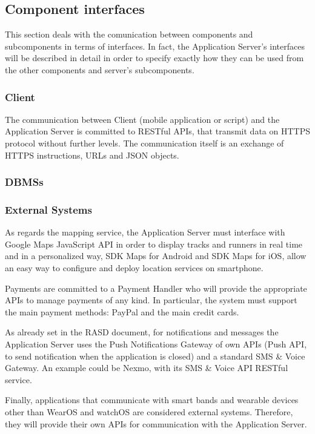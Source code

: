 \subsection{Component interfaces}
This section deals with the comunication between components and subcomponents in terms of interfaces. In fact, the Application Server's interfaces will be described in detail in order to specify exactly how they can be used from the other components and server's subcomponents.

\subsubsection{Client}

The communication between Client (mobile application or script) and the Application Server is committed to RESTful APIs, that transmit data on HTTPS protocol without further levels. The communication itself is an exchange of HTTPS instructions, URLs and JSON objects.

\subsubsection{DBMSs}

\subsubsection{External Systems}

As regards the mapping service, the Application Server must interface with Google Maps JavaScript API in order to display tracks and runners in real time and in a personalized way, SDK Maps for Android and SDK Maps for iOS, allow an easy way to configure and deploy location services on smartphone.

Payments are committed to a Payment Handler who will provide the appropriate APIs to manage payments of any kind. In particular, the system must support the main payment methods: PayPal and the main credit cards.

As already set in the RASD document, for notifications and messages the Application Server uses the Push Notifications Gateway of own APIs (Push API, to send notification when the application is closed) and a standard SMS \& Voice Gateway. 
An example could be Nexmo, with its SMS \& Voice API RESTful service.

Finally, applications that communicate with smart bands and wearable devices other than WearOS and watchOS are considered external systems. Therefore, they will provide their own APIs for communication with the Application Server.

